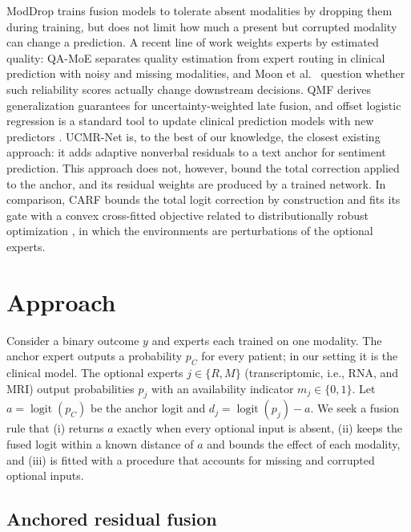 \documentclass[runningheads]{llncs}
\newcommand{\logit}{\operatorname{logit}}
\begin{document}
ModDrop \cite{neverova2015} trains fusion models to tolerate absent modalities by dropping them during training, but does not limit how much a present but corrupted modality can change a prediction. A recent line of work weights experts by estimated quality: QA-MoE \cite{sun2026} separates quality estimation from expert routing in clinical prediction with noisy and missing modalities, and Moon et al.~\cite{moon2026} question whether such reliability scores actually change downstream decisions. QMF \cite{zhang2023qmf} derives generalization guarantees for uncertainty-weighted late fusion, and offset logistic regression is a standard tool to update clinical prediction models with new predictors \cite{janssen2008}. UCMR-Net \cite{tang2026} is, to the best of our knowledge, the closest existing approach: it adds adaptive nonverbal residuals to a text anchor for sentiment prediction. This approach does not, however, bound the total correction applied to the anchor, and its residual weights are produced by a trained network. In comparison, CARF bounds the total logit correction by construction and fits its gate with a convex cross-fitted objective related to distributionally robust optimization \cite{sagawa2020}, in which the environments are perturbations of the optional experts.

\section{Approach}

Consider a binary outcome $y$ and experts each trained on one modality. The anchor expert outputs a probability $p_C$ for every patient; in our setting it is the clinical model. The optional experts $j\in\{R,M\}$ (transcriptomic, i.e., RNA, and MRI) output probabilities $p_j$ with an availability indicator $m_j\in\{0,1\}$. Let $a=\logit(p_C)$ be the anchor logit and $d_j=\logit(p_j)-a$. We seek a fusion rule that (i) returns $a$ exactly when every optional input is absent, (ii) keeps the fused logit within a known distance of $a$ and bounds the effect of each modality, and (iii) is fitted with a procedure that accounts for missing and corrupted optional inputs.

\subsection{Anchored residual fusion}
\end{document}
